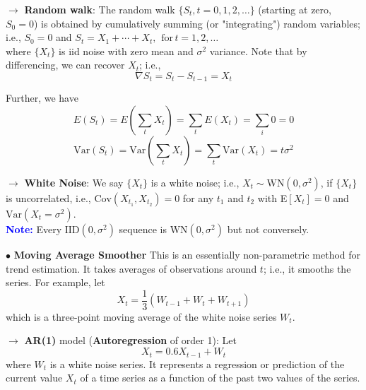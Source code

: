 \documentclass[letterpaper, 10.5pt,landscape]{article}
\begin{document}
\begin{multicols*}{3}
\vspace{3pt}
$\rightarrow$ \textbf{Random walk}: The random walk $\{S_{t}, t=0,1,2, \ldots \}$ (starting at zero, $S_{0} = 0$) is obtained by cumulatively summing (or "integrating") random variables; i.e., $S_{0}=0$ and $S_{t} = X_{1} + \cdots + X_{t}, \hspace{5pt} \text{for} \hspace{2pt} t=1,2,\ldots$ \\
where $\{X_{t} \}$ is iid noise with zero mean and $\sigma^{2}$ variance. Note that by differencing, we can recover $X_{t}$; i.e.,
\vspace{-3pt}
\[\nabla  S_{t} = S_{t} - S_{t-1} = X_{t} \]

\vspace{-3pt}
Further, we have
\vspace{-3pt}
\[E(S_{t}) =  E\left( \sum_{t} X_{t} \right) = \sum_{t} E(X_{t}) = \sum_{i} 0 = 0\]
\vspace{-3pt}
\[\text{Var}(S_{t}) = \text{Var}\left(\sum_{t} X_{t} \right) = \sum_{t} \text{Var}(X_{t}) = t\sigma^{2} \]


$\rightarrow$ \textbf{White Noise}: We say $\{X_{t} \}$ is a white noise; i.e., $X_{t} \sim \text{WN}(0, \sigma^{2})$, if $\{X_{t} \}$ is uncorrelated, i.e., $\text{Cov}\left(X_{t_{1}}, X_{t_{2}}\right) = 0 $ for any $t_{1}$ and $t_{2}$ with E$[X_{t}] = 0$ and $\text{Var}(X_{t} = \sigma^{2})$. \\

\vspace{3pt}
\textcolor{blue}{\textbf{Note:}} Every $\text{IID}(0, \sigma^{2})$ sequence is $\text{WN}(0, \sigma^{2})$ but not conversely. \\


\vspace{5pt}

$\bullet$ \textbf{Moving Average Smoother} This is an essentially non-parametric method for trend estimation. It takes averages of observations around $t$; i.e., it smooths the series. For example, let 
\vspace{-3pt}
\[X_{t} = \frac{1}{3}\left(W_{t-1} + W_{t} + W_{t+1} \right)\]
which is a three-point moving average of the white noise series $W_{t}$. 

\vspace{2pt}
$\rightarrow$ \textbf{AR(1)} model (\textbf{Autoregression} of order 1): Let
\vspace{-3pt}
\[X_{t} = 0.6X_{t-1} + W_{t} \]
where $W_{t}$ is a white noise series. It represents a regression or prediction of the current value $X_{t}$ of a time series as a function of the past two values of the series.





\end{multicols*}
\end{document}
